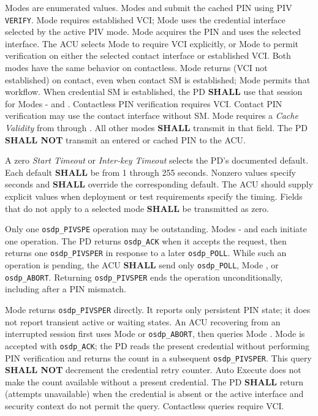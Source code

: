 Modes are enumerated values. Modes  and  submit the
cached PIN using PIV \texttt{VERIFY}. Mode  requires established
VCI; Mode  uses the credential interface selected by the active
PIV mode. Mode  acquires the PIN and uses the selected interface.
The ACU selects Mode  to require VCI explicitly, or Mode
 to permit verification on either the selected contact interface
or established VCI. Both modes have the same behavior on contactless.
Mode  returns  (VCI not established) on contact,
even when contact SM is established; Mode  permits that workflow.
When credential SM is established, the PD \textbf{SHALL} use that session
for Modes - and .
Contactless PIN verification requires VCI. Contact PIN verification may use
the contact interface without SM. Mode  requires a \emph{Cache Validity} from
 through . All other modes \textbf{SHALL} transmit
 in that field. The PD \textbf{SHALL NOT} transmit an entered or
cached PIN to the ACU.

A zero \emph{Start Timeout} or \emph{Inter-key Timeout} selects the PD's
documented default. Each default \textbf{SHALL} be from 1 through 255 seconds.
Nonzero values specify seconds and \textbf{SHALL} override the corresponding
default. The ACU should supply explicit values when deployment or test
requirements specify the timing. Fields that do not apply to a selected mode
\textbf{SHALL} be transmitted as zero.

Only one \texttt{osdp\_PIVSPE} operation may be outstanding. Modes
- and  each initiate one operation. The PD returns
\texttt{osdp\_ACK} when it accepts the request, then returns one
\texttt{osdp\_PIVSPER} in response to a later \texttt{osdp\_POLL}. While such
an operation is pending, the ACU \textbf{SHALL} send only
\texttt{osdp\_POLL}, Mode , or \texttt{osdp\_ABORT}. Returning
\texttt{osdp\_PIVSPER} ends the operation unconditionally, including after a
PIN mismatch.

Mode  returns \texttt{osdp\_PIVSPER} directly. It reports only
persistent PIN state; it does not report transient active or waiting states.
An ACU recovering from an interrupted session first uses Mode  or
\texttt{osdp\_ABORT}, then queries Mode . Mode  is
accepted with \texttt{osdp\_ACK}; the PD reads the present credential without
performing PIN verification and returns the count in a subsequent
\texttt{osdp\_PIVSPER}. This query \textbf{SHALL NOT} decrement the credential
retry counter. Auto Execute does not make the count available without a
present credential. The PD \textbf{SHALL} return  (attempts
unavailable) when the credential is absent or the active interface and
security context do not permit the query. Contactless queries require VCI.

